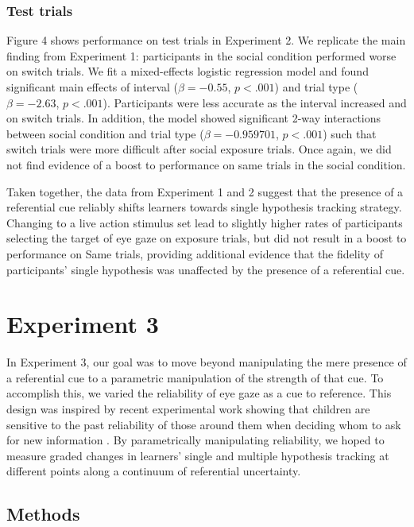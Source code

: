 \documentclass[10pt,letterpaper]{article}
\begin{document}
\subsubsection{Test trials}

Figure 4 shows performance on test trials in Experiment 2. We replicate the main finding from Experiment 1: participants in the social condition performed worse on switch trials. We fit a mixed-effects logistic regression model and found significant main effects of interval ($\beta=  -0.55$, $p< .001$) and trial type ($\beta=  -2.63$, $p< .001$). Participants were less accurate as the interval increased and on switch trials. In addition, the model showed significant 2-way interactions between social condition and trial type ($\beta=  -0.959701$, $p< .001$) such that switch trials were more difficult after social exposure trials. Once again, we did not find evidence of a boost to performance on same trials in the social condition. 

Taken together, the data from Experiment 1 and 2 suggest that the presence of a referential cue reliably shifts learners towards single hypothesis tracking strategy. Changing to a live action stimulus set lead to slightly higher rates of participants selecting the target of eye gaze on exposure trials, but did not result in a boost to performance on Same trials, providing additional evidence that the fidelity of participants' single hypothesis was unaffected by the presence of a referential cue.


\section{Experiment 3}

In Experiment 3, our goal was to move beyond manipulating the mere presence of a referential cue to a parametric manipulation of the strength of that cue. To accomplish this, we varied the reliability of eye gaze as a cue to reference. This design was inspired by recent experimental work showing that children are sensitive to the past reliability of those around them when deciding whom to ask for new information \cite{koenig2004trust}. By parametrically manipulating reliability, we hoped to measure graded changes in learners' single and multiple hypothesis tracking at different points along a continuum of referential uncertainty.

\subsection{Methods}
\end{document}
